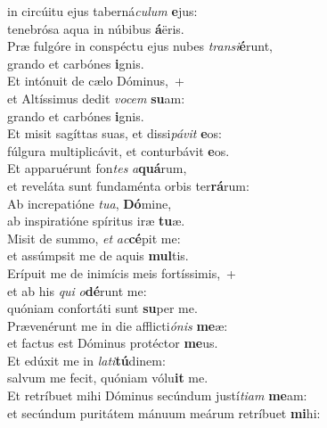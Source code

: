 \oddverse  in circúitu ejus taberná\textit{cu}\textit{lum} \textbf{e}jus:~\*\\
\oddverse tenebrósa aqua in núbibus \textbf{á}ëris.\\
\evenverse Præ fulgóre in conspéctu ejus nubes \textit{tran}\textit{si}\textbf{é}runt,~\*\\
\evenverse grando et carbónes \textbf{i}gnis.\\
\oddverse Et intónuit de cælo Dóminus,~+\\
\oddverse  et Altíssimus dedit \textit{vo}\textit{cem} \textbf{su}am:~\*\\
\oddverse grando et carbónes \textbf{i}gnis.\\
\evenverse Et misit sagíttas suas, et dissi\textit{pá}\textit{vit} \textbf{e}os:~\*\\
\evenverse fúlgura multiplicávit, et conturbávit \textbf{e}os.\\
\oddverse Et apparuérunt fon\textit{tes} \textit{a}\textbf{quá}rum,~\*\\
\oddverse et reveláta sunt fundaménta orbis ter\textbf{rá}rum:\\
\evenverse Ab increpatióne \textit{tu}\textit{a}, \textbf{Dó}mine,~\*\\
\evenverse ab inspiratióne spíritus iræ \textbf{tu}æ.\\
\oddverse Misit de summo, \textit{et} \textit{ac}\textbf{cé}pit me:~\*\\
\oddverse et assúmpsit me de aquis \textbf{mul}tis.\\
\evenverse Erípuit me de inimícis meis fortíssimis,~+\\
\evenverse  et ab his \textit{qui} \textit{o}\textbf{dé}runt me:~\*\\
\evenverse quóniam confortáti sunt \textbf{su}per me.\\
\oddverse Prævenérunt me in die afflicti\textit{ó}\textit{nis} \textbf{me}æ:~\*\\
\oddverse et factus est Dóminus protéctor \textbf{me}us.\\
\evenverse Et edúxit me in \textit{la}\textit{ti}\textbf{tú}dinem:~\*\\
\evenverse salvum me fecit, quóniam vólu\textbf{it} me.\\
\oddverse Et retríbuet mihi Dóminus secúndum justí\textit{ti}\textit{am} \textbf{me}am:~\*\\
\oddverse et secúndum puritátem mánuum meárum retríbuet \textbf{mi}hi:\\
